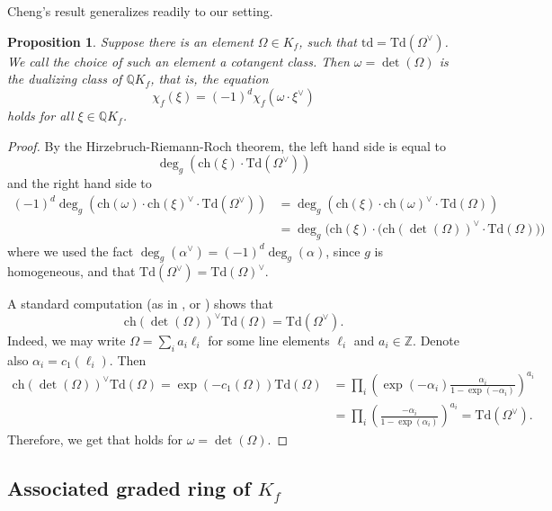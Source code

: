 \documentclass[oneside]{amsart}
\theoremstyle{plain}
\newtheorem{proposition}[theorem]{Proposition}
\theoremstyle{definition}
\newcommand{\Z}{{\mathbb{Z}}}
\newcommand{\Q}{{\mathbb{Q}}}
\newcommand{\ch}{{\mathrm{ch}}}
\newcommand{\td}{{\mathrm{td}}}
\newcommand{\Td}{{\mathrm{Td}}}
\begin{document}
Cheng's result generalizes readily to our setting.

\begin{proposition}
\label{prop:cotangent-todd-dualizing}
    Suppose there is an element $\Omega \in K_f$, such that $\td = \Td(\Omega^\vee)$.
    We call the choice of such an element a \emph{cotangent class}.
    Then $\omega = \det(\Omega)$ is the dualizing class of $\Q K_f$, that is, the equation
    \begin{equation}\label{eq:serre-duality}
        \chi_f(\xi) = (-1)^d \chi_f(\omega \cdot \xi^\vee)
    \end{equation}
    holds for all $\xi \in \Q K_f$.
\end{proposition}

\begin{proof}
    By the Hirzebruch-Riemann-Roch theorem, the left hand side is equal to \[\deg_g(\ch(\xi)\cdot \Td(\Omega^\vee))\] and the right hand side to
    \begin{align*}
        (-1)^d\deg_g(\ch(\omega) \cdot \ch(\xi)^\vee \cdot \Td(\Omega^\vee)) &= 
        \deg_g(\ch(\xi) \cdot \ch(\omega)^\vee \cdot \Td(\Omega))\\
        &=\deg_g\big(\ch(\xi) \cdot \big(\ch(\det(\Omega))^\vee \cdot \Td(\Omega)\big)\big)
    \end{align*}
    where we used the fact $\deg_g(\alpha^\vee) = (-1)^d\deg_g(\alpha)$, since $g$ is homogeneous, and that $\Td(\Omega^\vee) = \Td(\Omega)^\vee$.
    
    A standard computation (as in \cite[Proposition 5.2]{FultonLang85}, or \cite[Proposition 3.20]{Cheng2025}) shows that
    \[\ch(\det(\Omega))^\vee\Td(\Omega) = \Td(\Omega^\vee).\]
    Indeed, we may write $\Omega = \sum_i a_i \ell_i$ for some line elements $\ell_i$ and $a_i \in \Z$.
    Denote also $\alpha_i = c_1(\ell_i)$.
    Then
    \begin{align*}
        \ch(\det(\Omega))^\vee\Td(\Omega) = \exp(-c_1(\Omega))\Td(\Omega)
        &= \prod_i\left(\exp(-\alpha_i)\frac{\alpha_i}{1 - \exp(-\alpha_i)}\right)^{a_i}\\
        &= \prod_i\left(\frac{-\alpha_i}{1 - \exp(\alpha_i)}\right)^{a_i} = \Td(\Omega^\vee).
    \end{align*}
    Therefore, we get that  holds for $\omega = \det(\Omega)$.
\end{proof}


\subsection{Associated graded ring of \texorpdfstring{$K_f$}{Kf}}
\label{sec:associated-graded}
\end{document}
